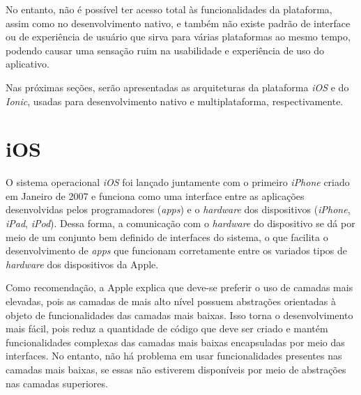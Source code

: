 No entanto, não é possível ter acesso total às funcionalidades da plataforma, assim como no desenvolvimento nativo, e também não existe padrão de interface ou de experiência de usuário que sirva
para várias plataformas ao mesmo tempo, podendo causar uma sensação ruim na usabilidade e experiência de uso do aplicativo. 


Nas próximas seções, serão apresentadas as arquiteturas da plataforma \textit{iOS} e do \textit{Ionic}, usadas para desenvolvimento nativo e multiplataforma, respectivamente.


\section{iOS} \label{ios}

O sistema operacional \textit{iOS} foi lançado juntamente com o primeiro \textit{iPhone} criado em Janeiro de 2007 e 
funciona como uma interface entre as aplicações desenvolvidas pelos programadores (\textit{apps}) e o \textit{hardware} 
dos dispositivos (\textit{iPhone}, \textit{iPad}, \textit{iPod}). Dessa forma, a comunicação com o \textit{hardware} do dispositivo se dá 
por meio de um conjunto bem definido de interfaces do sistema, o que facilita o desenvolvimento de \textit{apps} 
que funcionam corretamente entre os variados tipos de \textit{hardware} dos dispositivos da Apple. 

Como recomendação, a Apple explica que deve-se preferir o uso de camadas mais elevadas, pois as camadas de 
mais alto nível possuem abstrações orientadas à objeto de funcionalidades das camadas mais baixas. Isso 
torna o desenvolvimento mais fácil, pois reduz a quantidade de código que deve ser criado e mantém funcionalidades 
complexas das camadas mais baixas encapsuladas por meio das interfaces. No entanto, não há problema em usar 
funcionalidades presentes nas camadas mais baixas, se essas não estiverem disponíveis por meio de abstrações nas 
camadas superiores. 

